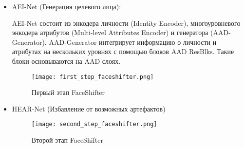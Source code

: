 \begin{itemize}
    \item AEI-Net (Генерация целевого лица):
    
    AEI-Net состоит из энкодера личности (Identity Encoder), многоуровневого энкодера атрибутов (Multi-level Attributes Encoder) и генератора (AAD-Generator). AAD-Generator интегрирует информацию о личности и атрибутах на нескольких уровнях с помощью блоков AAD ResBlks. Такие блоки основываются на AAD слоях.
    \begin{figure}[H]
        \centering
        \texttt{[image: first\_step\_faceshifter.png]}
        \caption{Первый этап FaceShifter \cite{li2020faceshifter}}
        \label{fig:first_step_faceshifter}
    \end{figure} 
    \item HEAR-Net (Избавление от возможных артефактов)
    \begin{figure}[H]
        \centering
        \texttt{[image: second\_step\_faceshifter.png]}
        \caption{Второй этап FaceShifter \cite{li2020faceshifter}}
        \label{fig:second_step_faceshifter}
    \end{figure}
\end{itemize}

